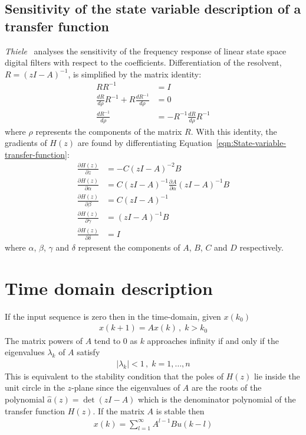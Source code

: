 \documentclass[a4paper,twoside,10pt,english]{report}
\begin{document}
\subsection{\label{sec:Sensitivity-analysis-state-variable-transfer-function}Sensitivity of the state variable description of a transfer function}
\emph{Thiele}~\cite{Theile_SensitivityLinearStateSpaceSystems} analyses the
sensitivity of the frequency response of linear state space digital filters 
with respect to the coefficients. Differentiation of the resolvent,
$R=\left(zI-A\right)^{-1}$, is simplified
by the matrix identity:
\begin{align*}
RR^{-1} &= I \\
\frac{dR}{d\rho}R^{-1} +R\frac{dR^{-1}}{d\rho} &= 0\\
\frac{dR^{-1}}{d\rho} &=-R^{-1}\frac{dR}{d\rho}R^{-1}
\end{align*}
where $\rho$ represents the components of the matrix $R$.
With this identity, the gradients of $H\left(z\right)$ are found by
differentiating Equation~\ref{eqn:State-variable-transfer-function}:
\begin{align*}
\frac{\partial{}H\left(z\right)}{\partial{}z} &= 
-C\left(zI-A\right)^{-2}B \\
\frac{\partial{}H\left(z\right)}{\partial\alpha} &= 
C\left(zI-A\right)^{-1}\frac{\partial{}A}{\partial\alpha}
\left(zI-A\right)^{-1}B \\
\frac{\partial{}H\left(z\right)}{\partial\beta} &= 
C\left(zI-A\right)^{-1}\\
\frac{\partial{}H\left(z\right)}{\partial\gamma} &= 
\left(zI-A\right)^{-1}B\\
\frac{\partial{}H\left(z\right)}{\partial\delta} &= I
\end{align*}
where $\alpha$, $\beta$, $\gamma$ and $\delta$ represent the
components of $A$, $B$, $C$ and $D$ respectively.
\section{Time domain description}
If the input sequence is zero then in the time-domain, given 
$x\left(k_{0}\right)$
\begin{align*}
x\left(k+1\right) = Ax\left(k\right)\, , \; k>k_{0}
\end{align*}
The matrix powers of $A$ tend to $0$ as $k$ approaches infinity
if and only if the eigenvalues $\lambda_{k}$ of $A$ satisfy
\begin{align*}
\left|\lambda_{k}\right|<1\,{},\;k=1,\ldots{},n
\end{align*}
This is equivalent to the stability condition that the poles of $H\left(z\right)$
lie inside the unit circle in the $z$-plane since the eigenvalues of $A$ are 
the roots of the polynomial $\hat{a}\left(z\right)=\det\left(zI-A\right)$
which is the denominator polynomial of the transfer function $H\left(z\right)$.
If the matrix $A$ is stable then
\begin{align*}
x\left(k\right) = \sum_{l=1}^{\infty}A^{l-1}Bu\left(k-l\right)
\end{align*}
\end{document}
